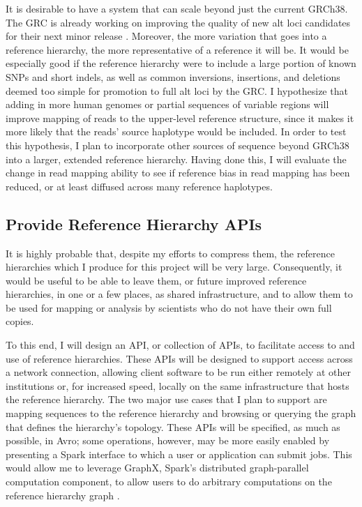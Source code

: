 \documentclass[11pt,proposal]{ucthesis}
\begin{document}
It is desirable to have a system that can scale beyond just the current GRCh38. The GRC is already working on improving the quality of new alt loci candidates for their next minor release \cite{church2014story}. Moreover, the more variation that goes into a reference hierarchy, the more representative of a reference it will be. It would be especially good if the reference hierarchy were to include a large portion of known SNPs and short indels, as well as common inversions, insertions, and deletions deemed too simple for promotion to full alt loci by the GRC. I hypothesize that adding in more human genomes or partial sequences of variable regions will improve mapping of reads to the upper-level reference structure, since it makes it more likely that the reads' source haplotype would be included. In order to test this hypothesis, I plan to incorporate other sources of sequence beyond GRCh38 into a larger, extended reference hierarchy. Having done this, I will evaluate the change in read mapping ability to see if reference bias in read mapping has been reduced, or at least diffused across many reference haplotypes.

\subsection{Provide Reference Hierarchy APIs}
\label{subsec:aim2api}

It is highly probable that, despite my efforts to compress them, the reference hierarchies which I produce for this project will be very large. Consequently, it would be useful to be able to leave them, or future improved reference hierarchies, in one or a few places, as shared infrastructure, and to allow them to be used for mapping or analysis by scientists who do not have their own full copies.

To this end, I will design an API, or collection of APIs, to facilitate access to and use of reference hierarchies. These APIs will be designed to support access across a network connection, allowing client software to be run either remotely at other institutions or, for increased speed, locally on the same infrastructure that hosts the reference hierarchy. The two major use cases that I plan to support are mapping sequences to the reference hierarchy and browsing or querying the graph that defines the hierarchy's topology. These APIs will be specified, as much as possible, in Avro; some operations, however, may be more easily enabled by presenting a Spark interface to which a user or application can submit jobs. This would allow me to leverage GraphX, Spark's distributed graph-parallel computation component, to allow users to do arbitrary computations on the reference hierarchy graph \cite{xin2013graphx}.
\end{document}
